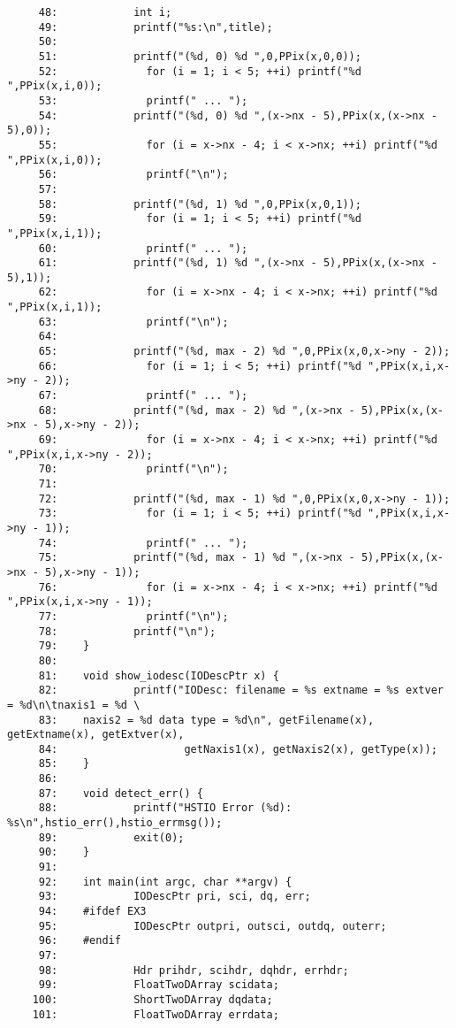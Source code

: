 \begin{scriptsize}
\begin{verbatim}
     48:            int i;
     49:            printf("%s:\n",title);
     50:    
     51:            printf("(%d, 0) %d ",0,PPix(x,0,0));
     52:              for (i = 1; i < 5; ++i) printf("%d ",PPix(x,i,0)); 
     53:              printf(" ... ");
     54:            printf("(%d, 0) %d ",(x->nx - 5),PPix(x,(x->nx - 5),0));
     55:              for (i = x->nx - 4; i < x->nx; ++i) printf("%d ",PPix(x,i,0));
     56:              printf("\n");
     57:    
     58:            printf("(%d, 1) %d ",0,PPix(x,0,1));
     59:              for (i = 1; i < 5; ++i) printf("%d ",PPix(x,i,1)); 
     60:              printf(" ... ");
     61:            printf("(%d, 1) %d ",(x->nx - 5),PPix(x,(x->nx - 5),1));
     62:              for (i = x->nx - 4; i < x->nx; ++i) printf("%d ",PPix(x,i,1));
     63:              printf("\n");
     64:    
     65:            printf("(%d, max - 2) %d ",0,PPix(x,0,x->ny - 2));
     66:              for (i = 1; i < 5; ++i) printf("%d ",PPix(x,i,x->ny - 2)); 
     67:              printf(" ... ");
     68:            printf("(%d, max - 2) %d ",(x->nx - 5),PPix(x,(x->nx - 5),x->ny - 2));
     69:              for (i = x->nx - 4; i < x->nx; ++i) printf("%d ",PPix(x,i,x->ny - 2));
     70:              printf("\n");
     71:    
     72:            printf("(%d, max - 1) %d ",0,PPix(x,0,x->ny - 1));
     73:              for (i = 1; i < 5; ++i) printf("%d ",PPix(x,i,x->ny - 1)); 
     74:              printf(" ... ");
     75:            printf("(%d, max - 1) %d ",(x->nx - 5),PPix(x,(x->nx - 5),x->ny - 1));
     76:              for (i = x->nx - 4; i < x->nx; ++i) printf("%d ",PPix(x,i,x->ny - 1));
     77:              printf("\n");
     78:            printf("\n");
     79:    }
     80:    
     81:    void show_iodesc(IODescPtr x) {
     82:            printf("IODesc: filename = %s extname = %s extver = %d\n\tnaxis1 = %d \
     83:    naxis2 = %d data type = %d\n", getFilename(x), getExtname(x), getExtver(x), 
     84:                    getNaxis1(x), getNaxis2(x), getType(x));
     85:    }
     86:    
     87:    void detect_err() {
     88:            printf("HSTIO Error (%d): %s\n",hstio_err(),hstio_errmsg());
     89:            exit(0);
     90:    }
     91:    
     92:    int main(int argc, char **argv) {
     93:            IODescPtr pri, sci, dq, err;
     94:    #ifdef EX3
     95:            IODescPtr outpri, outsci, outdq, outerr;
     96:    #endif
     97:    
     98:            Hdr prihdr, scihdr, dqhdr, errhdr;
     99:            FloatTwoDArray scidata;
    100:            ShortTwoDArray dqdata;
    101:            FloatTwoDArray errdata;

\end{verbatim}
\end{scriptsize}
